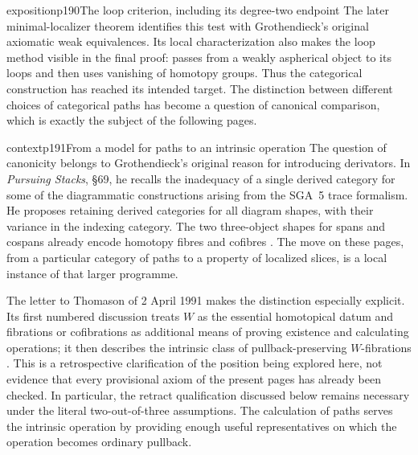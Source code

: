 \begin{dcomment}{exposition}{p190}{The loop criterion, including its degree-two endpoint}
The later minimal-localizer theorem identifies this test with Grothendieck's original axiomatic weak equivalences. Its local characterization also makes the loop method visible in the final proof: \citet[Theorem~2.3.6, especially 2.3.6.3--2.3.6.4]{Cisinski2004Minimal} passes from a weakly aspherical object to its loops and then uses vanishing of homotopy groups. Thus the categorical construction has reached its intended target. The distinction between different choices of categorical paths has become a question of canonical comparison, which is exactly the subject of the following pages.
\end{dcomment}

\begin{dcomment}{context}{p191}{From a model for paths to an intrinsic operation}
The question of canonicity belongs to Grothendieck's original reason for introducing derivators. In \emph{Pursuing Stacks}, \S69, he recalls the inadequacy of a single derived category for some of the diagrammatic constructions arising from the SGA~5 trace formalism. He proposes retaining derived categories for all diagram shapes, with their variance in the indexing category. The two three-object shapes for spans and cospans already encode homotopy fibres and cofibres \citep[\S69, printed pp.~1--3]{Grothendieck1983}. The move on these pages, from a particular category of paths to a property of localized slices, is a local instance of that larger programme.

The letter to Thomason of 2 April 1991 makes the distinction especially explicit. Its first numbered discussion treats $W$ as the essential homotopical datum and fibrations or cofibrations as additional means of proving existence and calculating operations; it then describes the intrinsic class of pullback-preserving $W$-fibrations \citep[point~1, pp.~3--4]{Grothendieck1991Letter}. This is a retrospective clarification of the position being explored here, not evidence that every provisional axiom of the present pages has already been checked. In particular, the retract qualification discussed below remains necessary under the literal two-out-of-three assumptions. The calculation of paths serves the intrinsic operation by providing enough useful representatives on which the operation becomes ordinary pullback.
\end{dcomment}

